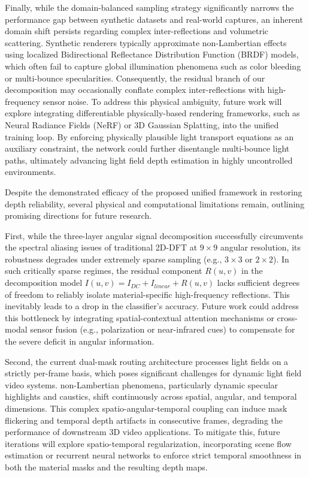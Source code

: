 \documentclass[lettersize,journal]{IEEEtran}
\begin{document}
Finally, while the domain-balanced sampling strategy significantly narrows the performance gap between synthetic datasets and real-world captures, an inherent domain shift persists regarding complex inter-reflections and volumetric scattering. Synthetic renderers typically approximate non-Lambertian effects using localized Bidirectional Reflectance Distribution Function (BRDF) models, which often fail to capture global illumination phenomena such as color bleeding or multi-bounce specularities. Consequently, the residual branch of our decomposition may occasionally conflate complex inter-reflections with high-frequency sensor noise. To address this physical ambiguity, future work will explore integrating differentiable physically-based rendering frameworks, such as Neural Radiance Fields (NeRF) or 3D Gaussian Splatting, into the unified training loop. By enforcing physically plausible light transport equations as an auxiliary constraint, the network could further disentangle multi-bounce light paths, ultimately advancing light field depth estimation in highly uncontrolled environments.

Despite the demonstrated efficacy of the proposed unified framework in restoring depth reliability, several physical and computational limitations remain, outlining promising directions for future research.

First, while the three-layer angular signal decomposition successfully circumvents the spectral aliasing issues of traditional 2D-DFT at $9 \times 9$ angular resolution, its robustness degrades under extremely sparse sampling (e.g., $3 \times 3$ or $2 \times 2$). In such critically sparse regimes, the residual component $R(u,v)$ in the decomposition model $I(u,v) = I_{DC} + I_{linear} + R(u,v)$ lacks sufficient degrees of freedom to reliably isolate material-specific high-frequency reflections. This inevitably leads to a drop in the classifier's accuracy. Future work could address this bottleneck by integrating spatial-contextual attention mechanisms or cross-modal sensor fusion (e.g., polarization or near-infrared cues) to compensate for the severe deficit in angular information.

Second, the current dual-mask routing architecture processes light fields on a strictly per-frame basis, which poses significant challenges for dynamic light field video systems. non-Lambertian phenomena, particularly dynamic specular highlights and caustics, shift continuously across spatial, angular, and temporal dimensions. This complex spatio-angular-temporal coupling can induce mask flickering and temporal depth artifacts in consecutive frames, degrading the performance of downstream 3D video applications. To mitigate this, future iterations will explore spatio-temporal regularization, incorporating scene flow estimation or recurrent neural networks to enforce strict temporal smoothness in both the material masks and the resulting depth maps.
\end{document}
